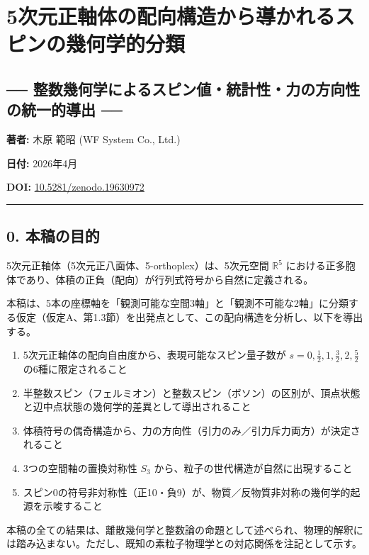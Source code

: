 \documentclass[a4paper,11pt]{ltjsarticle}
\providecommand{\tightlist}{\setlength{\itemsep}{0pt}\setlength{\parskip}{0pt}}
\begin{document}
\section*{5次元正軸体の配向構造から導かれるスピンの幾何学的分類}

\subsection*{── 整数幾何学によるスピン値・統計性・力の方向性の統一的導出 ──}

\textbf{著者:} 木原 範昭 (WF System Co., Ltd.)

\textbf{日付:} 2026年4月

\textbf{DOI:}
\href{https://doi.org/10.5281/zenodo.19630972}{10.5281/zenodo.19630972}

\begin{center}\rule{0.5\linewidth}{0.5pt}\end{center}

\subsection*{0. 本稿の目的}

5次元正軸体（5次元正八面体、5-orthoplex）は、5次元空間 $\mathbb{R}^5$ における正多胞体であり、体積の正負（配向）が行列式符号から自然に定義される。

本稿は、5本の座標軸を「観測可能な空間3軸」と「観測不可能な2軸」に分類する仮定（仮定A、第1.3節）を出発点として、この配向構造を分析し、以下を導出する。

\begin{enumerate}
\def\labelenumi{\arabic{enumi}.}
\tightlist
\item
  5次元正軸体の配向自由度から、表現可能なスピン量子数が
  $s = 0, \frac{1}{2}, 1, \frac{3}{2}, 2, \frac{5}{2}$
  の6種に限定されること
\item
  半整数スピン（フェルミオン）と整数スピン（ボソン）の区別が、頂点状態と辺中点状態の幾何学的差異として導出されること
\item
  体積符号の偶奇構造から、力の方向性（引力のみ／引力斥力両方）が決定されること
\item
  3つの空間軸の置換対称性 $S_3$
  から、粒子の世代構造が自然に出現すること
\item
  スピン0の符号非対称性（正10・負9）が、物質／反物質非対称の幾何学的起源を示唆すること
\end{enumerate}

本稿の全ての結果は、離散幾何学と整数論の命題として述べられ、物理的解釈には踏み込まない。ただし、既知の素粒子物理学との対応関係を注記として示す。
\end{document}
